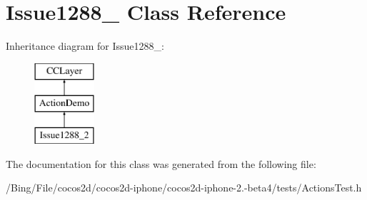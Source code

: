 \hypertarget{interface_issue1288__2}{\section{Issue1288\-\_ Class Reference}
\label{interface_issue1288__2}
}
Inheritance diagram for Issue1288\-\_\-:\begin{figure}[H]
\begin{center}
\leavevmode
\includegraphics[height=3.000000cm]{interface_issue1288__2}
\end{center}
\end{figure}


The documentation for this class was generated from the following file\-:\begin{DoxyCompactItemize}
\item 
/\-Bing/\-File/cocos2d/cocos2d-\/iphone/cocos2d-\/iphone-\/2.-\/beta4/tests/Actions\-Test.\-h\end{DoxyCompactItemize}
